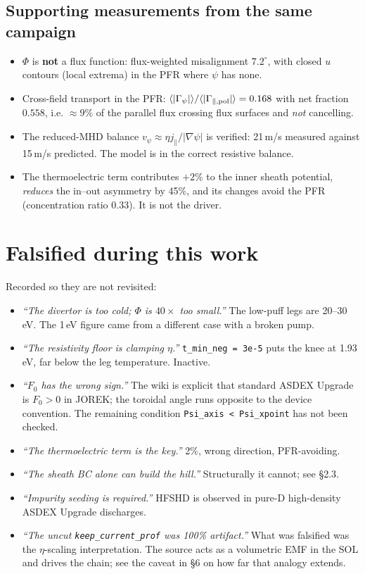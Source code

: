 \documentclass[11pt,a4paper]{article}
\newcommand{\code}[1]{\texttt{\small #1}}
\newcommand{\jpar}{j_\parallel}
\begin{document}
\subsection*{Supporting measurements from the same campaign}

\begin{itemize}\itemsep2pt
\item $\Phi$ is \textbf{not} a flux function: flux-weighted misalignment $7.2^\circ$, with closed
      $u$ contours (local extrema) in the PFR where $\psi$ has none.
\item Cross-field transport in the PFR: $\langle|\Gamma_\psi|\rangle/\langle|\Gamma_{\parallel,\rm pol}|\rangle = 0.168$
      with net fraction $0.558$, i.e. $\approx9\%$ of the parallel flux crossing flux surfaces
      and \emph{not} cancelling.
\item The reduced-MHD balance $v_\psi \approx \eta\jpar/|\nabla\psi|$ is verified: 21\,m/s
      measured against 15\,m/s predicted. The model is in the correct resistive balance.
\item The thermoelectric term contributes $+2\%$ to the inner sheath potential, \emph{reduces}
      the in--out asymmetry by 45\%, and its changes avoid the PFR (concentration ratio 0.33).
      It is not the driver.
\end{itemize}

\section{Falsified during this work}

Recorded so they are not revisited:

\begin{itemize}\itemsep2pt
\item \emph{``The divertor is too cold; $\Phi$ is $40\times$ too small.''} The low-puff legs are
      20--30\,eV. The 1\,eV figure came from a different case with a broken pump.
\item \emph{``The resistivity floor is clamping $\eta$.''} \code{t\_min\_neg = 3e-5} puts the knee
      at 1.93\,eV, far below the leg temperature. Inactive.
\item \emph{``$F_0$ has the wrong sign.''} The wiki is explicit that standard ASDEX Upgrade is
      $F_0>0$ in JOREK; the toroidal angle runs opposite to the device convention. The
      remaining condition \code{Psi\_axis < Psi\_xpoint} has not been checked.
\item \emph{``The thermoelectric term is the key.''} 2\%, wrong direction, PFR-avoiding.
\item \emph{``The sheath BC alone can build the hill.''} Structurally it cannot; see \S2.3.
\item \emph{``Impurity seeding is required.''} HFSHD is observed in pure-D high-density ASDEX
      Upgrade discharges.
\item \emph{``The uncut \code{keep\_current\_prof} was 100\% artifact.''} What was falsified was
      the $\eta$-scaling interpretation. The source acts as a volumetric EMF in the SOL and
      drives the chain; see the caveat in \S6 on how far that analogy extends.
\end{itemize}
\end{document}
